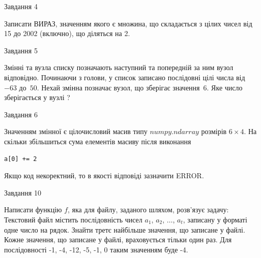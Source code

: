 \documentclass[12pt, ukrainian]{article}
\begin{document}
{\begin{minipage}[t]{8.0cm}
\begin{verbatim}
\end{verbatim}            

\end{minipage}


               
{\begin{center}Завдання {4}\end{center}}
\vspace{-4mm}
Записати ВИРАЗ, значенням якого є множина, що складається з цілих чисел від 15 до 2002 (включно), що діляться на 2.\par

\vspace{10mm}
               
{\begin{center}Завдання {5}\end{center}}
\vspace{-4mm}
Змінні  та  вузла списку позначають наступний та попередній за ним вузол відповідно. Починаючи з голови, у список записано послідовні цілі числа від~$-63$ до~$50$. Нехай змінна  позначає вузол, що зберігає значення~$6$.
Яке число зберігається у вузлі  ?\par

               
{\begin{center}Завдання {6}\end{center}}
\vspace{-4mm}
Значенням змінної  є цілочисловий масив типу $numpy.ndarray$ розмірів $6{\times}4$. На скільки збільшиться сума елементів масиву  після виконання
\begin{verbatim}
a[0] += 2
\end{verbatim}


Якщо код некоректний, то в якості відповіді зазначити ERROR.\par

               
{\begin{center}Завдання {10}\end{center}}
\vspace{-4mm}

Написати функцію $f$, яка для файлу, заданого шляхом, розв’язує задачу:\\ Текстовий файл містить послідовність чисел $a_1$, $a_2$, $\ldots$, $a_t$, записану у форматі одне число на рядок. Знайти третє найбільше значення, що записане у файлі. Кожне значення, що записане у файлі, враховується тільки один раз. Для послідовності -1, -4, -12, -5, -1, 0 таким значенням буде -4.

}
\end{document}
